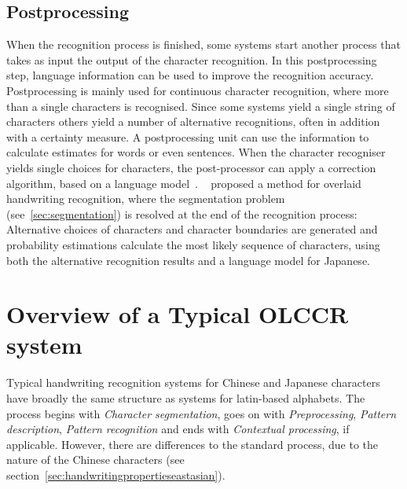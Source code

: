 \subsection{Postprocessing}
\label{sec:postprocessing}

When the recognition process is finished, some systems start another process
that takes as input the output of the character recognition. In this 
postprocessing step, language information can be used to improve the recognition
accuracy. Postprocessing is mainly used for continuous character recognition,
where more than a single characters is recognised. Since some systems yield a 
single string of characters others yield a number of alternative recognitions,
often in addition with a certainty measure.
A postprocessing unit can use the information to calculate estimates for words
or even sentences. When the character recogniser yields single choices for 
characters, the post-processor can apply a correction algorithm, based on a 
language model~.
~\citeyear{Shimodaira2003} proposed a method for overlaid handwriting 
recognition, where the segmentation problem (see~\ref{sec:segmentation}) is 
resolved at the end of the recognition process: Alternative choices of characters
and character boundaries are generated and probability estimations calculate
the most likely sequence of characters, using both the alternative recognition
results and a language model for Japanese.

\section{Overview of a Typical OLCCR system}
\label{sec:olccr:overview}


Typical handwriting recognition systems for Chinese and Japanese characters 
have broadly the same structure as systems for latin-based alphabets. The 
process begins with \emph{Character segmentation}, goes on with 
\emph{Preprocessing}, \emph{Pattern description}, \emph{Pattern recognition} and 
ends with \emph{Contextual processing}, if applicable. 
However, there are differences to the standard process, due to the nature of 
the Chinese characters (see section~\ref{sec:handwritingpropertieseastasian}).

